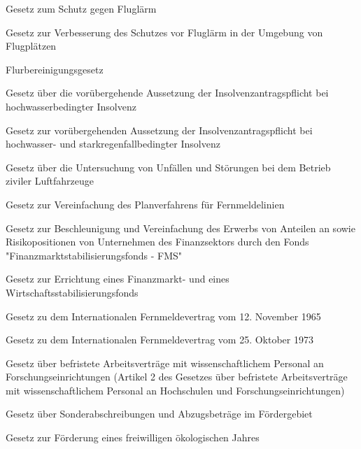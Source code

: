 \item[{FluLärmG}] Gesetz zum Schutz gegen Fluglärm

\item[{FluLärmSchutzVerbG}] Gesetz zur Verbesserung des Schutzes vor Fluglärm in der Umgebung von Flugplätzen

\item[{FlurbG}] Flurbereinigungsgesetz

\item[{FluthilfeInsoAntrAussG}] Gesetz über die vorübergehende Aussetzung der Insolvenzantragspflicht bei hochwasserbedingter Insolvenz

\item[{FluthilfeInsoAntrAussG-2016}] Gesetz zur vorübergehenden Aussetzung der Insolvenzantragspflicht bei hochwasser- und starkregenfallbedingter Insolvenz

\item[{FlUUG}] Gesetz über die Untersuchung von Unfällen und Störungen bei dem Betrieb ziviler Luftfahrzeuge

\item[{FMLG}] Gesetz zur Vereinfachung des Planverfahrens für Fernmeldelinien

\item[{FMStBG}] Gesetz zur Beschleunigung und Vereinfachung des Erwerbs von Anteilen an sowie Risikopositionen von Unternehmen des Finanzsektors durch den Fonds "Finanzmarktstabilisierungsfonds - FMS"

\item[{FMStFG}] Gesetz zur Errichtung eines Finanzmarkt- und eines Wirtschaftsstabilisierungsfonds

\item[{FMVtr1965G}] Gesetz zu dem Internationalen Fernmeldevertrag vom 12. November 1965

\item[{FMVtr1973G}] Gesetz zu dem Internationalen Fernmeldevertrag vom 25. Oktober 1973

\item[{FoArbVtrG}] Gesetz über befristete Arbeitsverträge mit wissenschaftlichem Personal an Forschungseinrichtungen (Artikel 2 des Gesetzes über befristete Arbeitsverträge mit wissenschaftlichem Personal an Hochschulen und Forschungseinrichtungen)

\item[{FöGbG}] Gesetz über Sonderabschreibungen und Abzugsbeträge im Fördergebiet

\item[{FÖJFG}] Gesetz zur Förderung eines freiwilligen ökologischen Jahres

